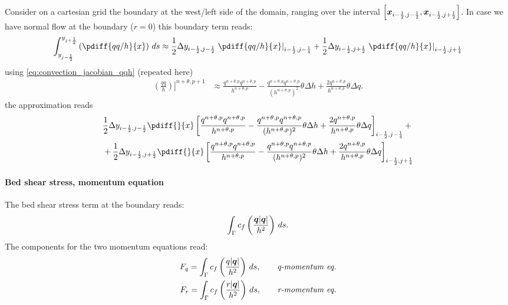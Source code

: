 Consider on a cartesian grid the boundary at the west/left side of the domain, ranging over the interval $\left[ \bm{x}_{i-\frac{1}{2}, j-\frac{1}{2}}, \bm{x}_{i-\frac{1}{2}, j+\frac{1}{2}} \right]$.
In case we have normal flow at the boundary ($r=0$) this boundary term reads:
\begin{align}
    \int^{y_{j+\half}}_{y_{j-\half}}\left(
    \pdiff{qq/h}{x}
    \right) \, ds \approx
    \half\Dy_{i-\half, j-\half}\left.\pdiff{qq/h}{x}\right|_{i-\half, j-\quart} + \half \Dy_{i-\half, j+\half}\left.\pdiff{qq/h}{x}\right|_{i-\half, j+\quart}
\end{align}
using \autoref{eq:convection_jacobian_qqh} (repeated here)
\begin{align}
    \left.\left(\frac{qq}{h}\right)\right|^{n+\theta, p+1} &  \approx
    \frac{q^{n+\theta, p}q^{n+\theta, p}}{h^{n+\theta, p}}
    - \frac{q^{n+\theta, p}q^{n+\theta, p}}{(h^{n+\theta, p})^2} \theta\Delta h
    + \frac{2 q^{n+\theta, p}}{h^{n+\theta, p}} \theta\Delta q.
\end{align}
the approximation reads
\begin{align}
    &\half\Dy_{i-\half, j-\half}
    \pdiff{}{x}\left[\frac{q^{n+\theta, p}q^{n+\theta, p}}{h^{n+\theta, p}}
    - \frac{q^{n+\theta, p}q^{n+\theta, p}}{(h^{n+\theta, p})^2} \theta\Delta h
    +
\frac{2 q^{n+\theta, p}}{h^{n+\theta, p}} \theta\Delta q \right]_{i-\half, j-\quart} +
    \nonumber \\*
& +
    \half \Dy_{i-\half, j+\half}
    \pdiff{}{x}\left[\frac{q^{n+\theta, p}q^{n+\theta, p}}{h^{n+\theta, p}}
    - \frac{q^{n+\theta, p}q^{n+\theta, p}}{(h^{n+\theta, p})^2} \theta\Delta h
    +
    \frac{2 q^{n+\theta, p}}{h^{n+\theta, p}} \theta\Delta q \right]_{i-\half, j+\quart}
\end{align}
\paragraph*{Bed shear stress, momentum equation}
The bed shear stress  term at the boundary  reads:
\begin{align}
    \int_\Gamma c_f \left( \frac{\bm{q}\lvert \bm{q} \rvert}{h^2} \right)\, ds.
\end{align}
The components for the two momentum equations read:
\begin{align}
    F_q = \int_\Gamma c_f \left( \frac{q\lvert \bm{q} \rvert}{h^2} \right)\, ds, \qquad \textit{q-momentum eq.}
    \\
    F_r = \int_\Gamma c_f \left( \frac{r\lvert \bm{q} \rvert}{h^2} \right)\, ds, \qquad \textit{r-momentum eq.}
\end{align}
\notyet

